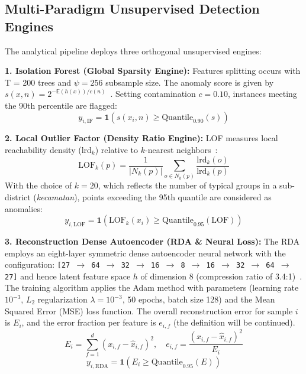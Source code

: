 \documentclass[conference]{IEEEtran}
\begin{document}
\subsection{Multi-Paradigm Unsupervised Detection Engines}

The analytical pipeline deploys three orthogonal unsupervised engines:

\textbf{1. Isolation Forest (Global Sparsity Engine):} Features splitting occurs with T = 200 trees and $\psi = 256$ subsample size. The anomaly score is given by $s(x, n) = 2^{-\mathbb{E}(h(x))/c(n)}$~\cite{ref18}. Setting contamination $c = 0.10$, instances meeting the 90th percentile are flagged:
\begin{equation}
y_{i, \mathrm{IF}} = \mathbf{1}\left(s(x_i, n) \ge \mathrm{Quantile}_{0.90}(s)\right)
\end{equation}

\textbf{2. Local Outlier Factor (Density Ratio Engine):} LOF measures local reachability density ($\text{lrd}_k$) relative to $k$-nearest neighbors~\cite{ref24}:
\begin{equation}
\mathrm{LOF}_k(p) = \frac{1}{|N_k(p)|} \sum_{o \in N_k(p)} \frac{\mathrm{lrd}_k(o)}{\mathrm{lrd}_k(p)}
\end{equation}
With the choice of $k = 20$, which reflects the number of typical groups in a sub-district (\textit{kecamatan}), points exceeding the 95th quantile are considered as anomalies:
\begin{equation}
y_{i, \mathrm{LOF}} = \mathbf{1}\left(\mathrm{LOF}_k(x_i) \ge \mathrm{Quantile}_{0.95}(\mathrm{LOF})\right)
\end{equation}

\textbf{3. Reconstruction Dense Autoencoder (RDA \& Neural Loss):} The RDA employs an eight-layer symmetric dense autoencoder neural network with the configuration: \texttt{[27 $\to$ 64 $\to$ 32 $\to$ 16 $\to$ 8 $\to$ 16 $\to$ 32 $\to$ 64 $\to$ 27]} and hence latent feature space $h$ of dimension 8 (compression ratio of 3.4:1)~\cite{ref32}. The training algorithm applies the Adam method with parameters (learning rate $10^{-3}$, $L_2$ regularization $\lambda = 10^{-3}$, 50 epochs, batch size 128) and the Mean Squared Error (MSE) loss function. The overall reconstruction error for sample $i$ is $E_i$, and the error fraction per feature is $e_{i,f}$ (the definition will be continued).
\begin{equation}
E_i = \sum_{f=1}^{d} (x_{i,f} - \hat{x}_{i,f})^2, \quad e_{i,f} = \frac{(x_{i,f} - \hat{x}_{i,f})^2}{E_i}
\end{equation}
\begin{equation}
y_{i, \mathrm{RDA}} = \mathbf{1}\left(E_i \ge \mathrm{Quantile}_{0.95}(E)\right)
\end{equation}
\end{document}

